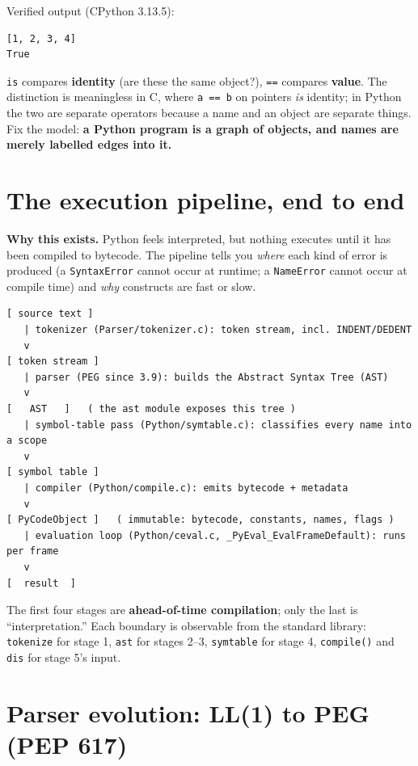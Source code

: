 Verified output (CPython 3.13.5):

\begin{lstlisting}[caption={Output}]
[1, 2, 3, 4]
True
\end{lstlisting}

\texttt{is} compares \textbf{identity} (are these the same object?), \texttt{==} compares
\textbf{value}. The distinction is meaningless in C, where \texttt{a == b} on pointers
\emph{is} identity; in Python the two are separate operators because a name and an object are
separate things. Fix the model: \textbf{a Python program is a graph of objects, and names
are merely labelled edges into it.}

\section{The execution pipeline, end to end}

\textbf{Why this exists.} Python feels interpreted, but nothing executes until it has been
compiled to bytecode. The pipeline tells you \emph{where} each kind of error is produced (a
\texttt{SyntaxError} cannot occur at runtime; a \texttt{NameError} cannot occur at compile
time) and \emph{why} constructs are fast or slow.

\begin{lstlisting}[caption={From text to result}]
[ source text ]
   | tokenizer (Parser/tokenizer.c): token stream, incl. INDENT/DEDENT
   v
[ token stream ]
   | parser (PEG since 3.9): builds the Abstract Syntax Tree (AST)
   v
[   AST   ]   ( the ast module exposes this tree )
   | symbol-table pass (Python/symtable.c): classifies every name into a scope
   v
[ symbol table ]
   | compiler (Python/compile.c): emits bytecode + metadata
   v
[ PyCodeObject ]   ( immutable: bytecode, constants, names, flags )
   | evaluation loop (Python/ceval.c, _PyEval_EvalFrameDefault): runs per frame
   v
[  result  ]
\end{lstlisting}

The first four stages are \textbf{ahead-of-time compilation}; only the last is
``interpretation.'' Each boundary is observable from the standard library: \texttt{tokenize}
for stage 1, \texttt{ast} for stages 2--3, \texttt{symtable} for stage 4, \texttt{compile()}
and \texttt{dis} for stage 5's input.

\section{Parser evolution: LL(1) to PEG (PEP 617)}

